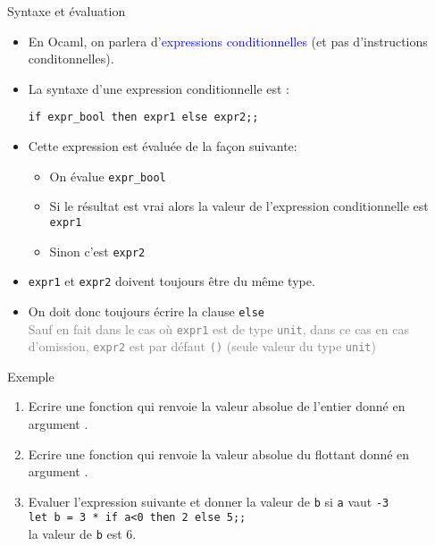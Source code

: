 \documentclass[10pt]{beamer}
\begin{document}
\begin{frame}[fragile]{\Ctitle}{\stitle}
	\begin{block}{Syntaxe et évaluation}
		\begin{itemize}
		\item<1-> En Ocaml, on parlera d'\textcolor{blue}{expressions conditionnelles} (et pas d'instructions conditonnelles).
		\item<2-> La syntaxe d'une expression conditionnelle est :
		\begin{verbatim}
if expr_bool then expr1 else expr2;;
		\end{verbatim}
		\item<3-> Cette expression est évaluée de la façon suivante:
		\begin{itemize}
			\item<4-> On évalue {\tt expr\_bool}
			\item<5-> Si le résultat est vrai alors la valeur de l'expression conditionnelle est {\tt expr1}
			\item<6-> Sinon c'est {\tt expr2}
		\end{itemize}
		\item<7-> {\tt expr1} et {\tt expr2} doivent toujours être du même type.
		\item<8-> On doit donc toujours écrire la clause {\tt else} \\
		\onslide<9->\textcolor{gray}{\small Sauf en fait dans le cas où {\tt expr1} est de type {\tt unit}, dans ce cas en cas d'omission, {\tt expr2} est par défaut {\tt ()} (seule valeur du type {\tt unit})}
	\end{itemize}
	\end{block}
\end{frame}

\begin{frame}{\Ctitle}{\stitle}
	\begin{exampleblock}{Exemple}
		\begin{enumerate}
			\item<1-> Ecrire une fonction  qui renvoie la valeur absolue de l'entier donné en argument .
				\onslide<2->
			\item<3-> Ecrire une fonction  qui renvoie la valeur absolue du flottant donné en argument .
				\onslide<4->
			\item<5-> Evaluer l'expression suivante et donner la valeur de {\tt b} si {\tt a} vaut {\tt -3}\\
				\texttt{let b = 3 * if a<0 then 2 else 5;;}\\
				\onslide<6->\textcolor{OliveGreen}{la valeur de {\tt b} est 6.}
		\end{enumerate}
	\end{exampleblock}
\end{frame}
\end{document}
